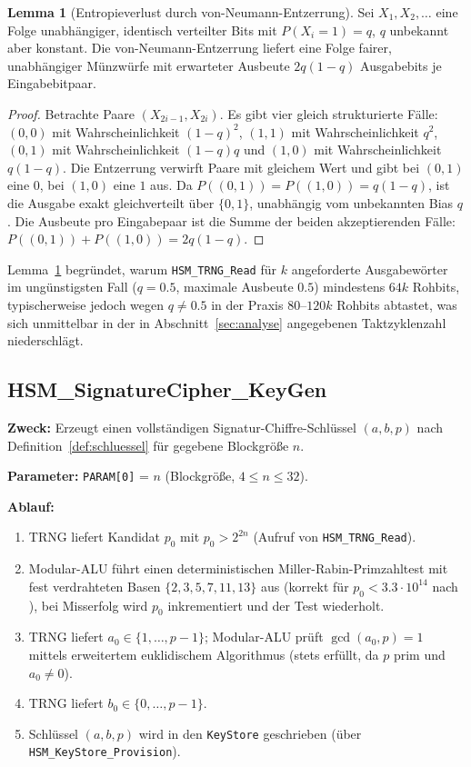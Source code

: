 ﻿\documentclass[a4paper,12pt]{article}
\theoremstyle{definition}
\newtheorem{lemma}{Lemma}
\begin{document}
\begin{lemma}[Entropieverlust durch von-Neumann-Entzerrung]
	\label{lem:vonneumann}
	Sei $X_1, X_2, \ldots$ eine Folge unabhängiger, identisch verteilter Bits mit $P(X_i=1)=q$, $q$ unbekannt aber konstant. Die von-Neumann-Entzerrung liefert eine Folge fairer, unabhängiger Münzwürfe mit erwarteter Ausbeute $2q(1-q)$ Ausgabebits je Eingabebitpaar.
\end{lemma}

\begin{proof}
	Betrachte Paare $(X_{2i-1}, X_{2i})$. Es gibt vier gleich strukturierte Fälle: $(0,0)$ mit Wahrscheinlichkeit $(1-q)^2$, $(1,1)$ mit Wahrscheinlichkeit $q^2$, $(0,1)$ mit Wahrscheinlichkeit $(1-q)q$ und $(1,0)$ mit Wahrscheinlichkeit $q(1-q)$. Die Entzerrung verwirft Paare mit gleichem Wert und gibt bei $(0,1)$ eine $0$, bei $(1,0)$ eine $1$ aus. Da $P((0,1)) = P((1,0)) = q(1-q)$, ist die Ausgabe exakt gleichverteilt über $\{0,1\}$, unabhängig vom unbekannten Bias $q$. Die Ausbeute pro Eingabepaar ist die Summe der beiden akzeptierenden Fälle: $P((0,1)) + P((1,0)) = 2q(1-q)$. \qedhere
\end{proof}

Lemma~\ref{lem:vonneumann} begründet, warum \texttt{HSM\_TRNG\_Read} für $k$ angeforderte Ausgabewörter im ungünstigsten Fall ($q=0.5$, maximale Ausbeute $0.5$) mindestens $64k$ Rohbits, typischerweise jedoch wegen $q \ne 0.5$ in der Praxis $80$--$120k$ Rohbits abtastet, was sich unmittelbar in der in Abschnitt~\ref{sec:analyse} angegebenen Taktzyklenzahl niederschlägt.

\subsection{HSM\_SignatureCipher\_KeyGen}

\textbf{Zweck:} Erzeugt einen vollständigen Signatur-Chiffre-Schlüssel $(a,b,p)$ nach Definition~\ref{def:schluessel} für gegebene Blockgröße $n$.

\textbf{Parameter:} \texttt{PARAM[0]} = $n$ (Blockgröße, $4 \le n \le 32$).

\textbf{Ablauf:}
\begin{enumerate}
	\item TRNG liefert Kandidat $p_0$ mit $p_0 > 2^{2n}$ (Aufruf von \texttt{HSM\_TRNG\_Read}).
	\item Modular-ALU führt einen deterministischen Miller-Rabin-Primzahltest mit fest verdrahteten Basen $\{2,3,5,7,11,13\}$ aus (korrekt für $p_0 < 3.3 \cdot 10^{14}$ nach \cite{Pom05}), bei Misserfolg wird $p_0$ inkrementiert und der Test wiederholt.
	\item TRNG liefert $a_0 \in \{1,\ldots,p-1\}$; Modular-ALU prüft $\gcd(a_0,p)=1$ mittels erweitertem euklidischem Algorithmus (stets erfüllt, da $p$ prim und $a_0 \ne 0$).
	\item TRNG liefert $b_0 \in \{0,\ldots,p-1\}$.
	\item Schlüssel $(a,b,p)$ wird in den \texttt{KeyStore} geschrieben (über \texttt{HSM\_KeyStore\_Provision}).
\end{enumerate}
\end{document}
